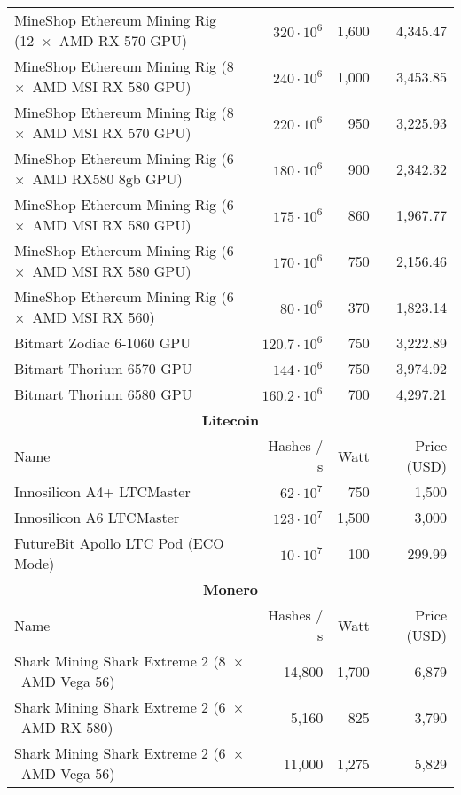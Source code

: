 \begin{longtable}{|p{}|r|r|r|}
  MineShop Ethereum Mining Rig (12~$\times$~AMD RX 570 GPU)           & $320 \cdot 10^6$ & 1,600 & 4,345.47 \\
  MineShop Ethereum Mining Rig (8~$\times$~AMD MSI RX 580 GPU)        & $240 \cdot 10^6$ & 1,000 & 3,453.85 \\
  MineShop Ethereum Mining Rig (8~$\times$~AMD MSI RX 570 GPU)        & $220 \cdot 10^6$ & 950 & 3,225.93 \\
  MineShop Ethereum Mining Rig (6~$\times$~AMD RX580 8gb GPU)         & $180 \cdot 10^6$ & 900 & 2,342.32 \\
  MineShop Ethereum Mining Rig (6~$\times$~AMD MSI RX 580 GPU)        & $175 \cdot 10^6$ & 860 & 1,967.77 \\
  MineShop Ethereum Mining Rig (6~$\times$~AMD MSI RX 580 GPU)        & $170 \cdot 10^6$ & 750 & 2,156.46 \\
  MineShop Ethereum Mining Rig (6~$\times$~AMD MSI RX 560)            & $ 80 \cdot 10^6$  & 370 & 1,823.14 \\
  Bitmart Zodiac 6-1060 GPU                                           & $120.7 \cdot 10^6$ & 750 & 3,222.89 \\
  Bitmart Thorium 6570 GPU                                            & $144 \cdot 10^6$ & 750 & 3,974.92 \\
  Bitmart Thorium 6580 GPU                                            & $160.2 \cdot 10^6$ & 700 & 4,297.21 \\
  \hline
  \multicolumn{4}{|c|}{\textbf{Litecoin}} \\
  \hline
  Name & Hashes / s & Watt & Price (USD)\\
  \hhline{|=|=|=|=|}
  Innosilicon A4+ LTCMaster           & $  62 \cdot 10^7$ & 750 & 1,500 \\
  Innosilicon A6 LTCMaster            & $ 123 \cdot 10^7$ & 1,500 & 3,000 \\
  FutureBit Apollo LTC Pod (ECO Mode) & $  10 \cdot 10^7$ & 100 & 299.99 \\
  \hline
  \multicolumn{4}{|c|}{\textbf{Monero}} \\
  \hline
  Name & Hashes / s & Watt & Price (USD)\\
  \hhline{|=|=|=|=|}
  Shark Mining Shark Extreme 2 (8~$\times$~AMD Vega 56) & 14,800 & 1,700 & 6,879 \\
  Shark Mining Shark Extreme 2 (6~$\times$~AMD RX 580) & 5,160 & 825 & 3,790 \\
  Shark Mining Shark Extreme 2 (6~$\times$~AMD Vega 56) & 11,000 & 1,275 & 5,829 \\

\end{longtable}
